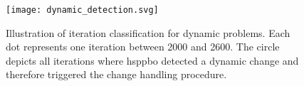 \begin{figure}[h]
	\centering
	\texttt{[image: dynamic\_detection.svg]}
	\caption[Illustration of iteration classification for dynamic problems]{Illustration of iteration classification for dynamic problems. Each dot represents one iteration between 2000 and 2600. The circle depicts all iterations where \gls{hsppbo} detected a dynamic change and therefore triggered the change handling procedure.}
	\label{fig:dynamic_detection}
\end{figure}